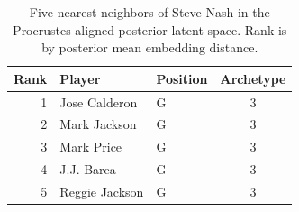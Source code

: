 \begin{table}[htbp]
  \centering\small
  \begin{tabular}{rllc}
    \toprule
    Rank & Player & Position & Archetype \\
    \midrule
    1 & Jose Calderon & G & 3 \\
    2 & Mark Jackson & G & 3 \\
    3 & Mark Price & G & 3 \\
    4 & J.J. Barea & G & 3 \\
    5 & Reggie Jackson & G & 3 \\
    \bottomrule
  \end{tabular}
  \caption{Five nearest neighbors of Steve Nash in the Procrustes-aligned posterior latent space. Rank is by posterior mean embedding distance.}
  \label{tab:Steve_Nash_neighbors}
\end{table}

